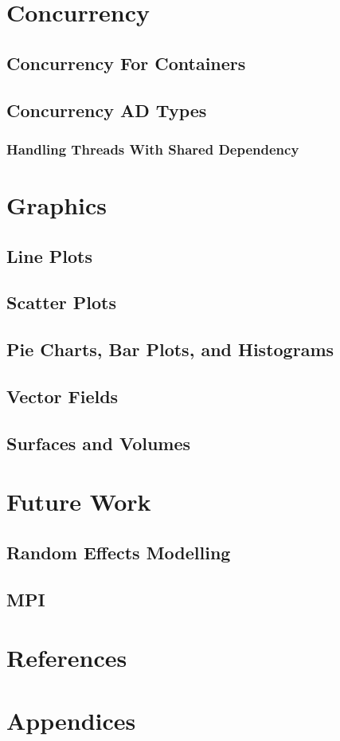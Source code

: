 \documentclass[12pt,a4paper]{article}
\begin{document}
\section{Concurrency}
\subsection{Concurrency For Containers}
\subsection{Concurrency AD Types}
\subsubsection{Handling Threads With Shared Dependency}
\section{Graphics}
\subsection{Line Plots}
\subsection{Scatter Plots}
\subsection{Pie Charts, Bar Plots, and Histograms}
\subsection{Vector Fields}
\subsection{Surfaces and Volumes}
\section{Future Work}
\subsection{Random Effects Modelling}
\subsection{MPI}
\section{References}
\section{Appendices}
\end{document}
